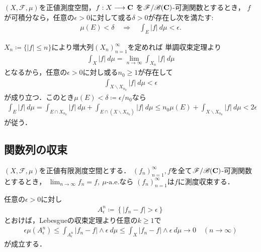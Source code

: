 	\begin{screen}
		\begin{thm}[可積分なら積分値を一様に小さくできる]\label{thm:integrable_intvalue_uniformly_shrinking}
			$(X,\mathscr{F},\mu)$を正値測度空間，$f:X \longrightarrow \mathbf{C}$
			を$\mathscr{F}/\mathscr{B}(\mathbf{C})$-可測関数とするとき，
			$f$が可積分なら，任意の$\epsilon > 0$に対して或る$\delta > 0$が存在し次を満たす:
			\begin{align}
				\mu(E) < \delta \quad \Longrightarrow \quad \int_E |f|\ d\mu < \epsilon.
			\end{align}
		\end{thm}
	\end{screen}
	
	\begin{prf}
		$X_n \coloneqq \{|f| \leq n\}$により増大列$(X_n)_{n=1}^\infty$を定めれば
		単調収束定理より
		\begin{align}
			\int_X |f|\ d\mu = \lim_{n \to \infty} \int_{X_n} |f|\ d\mu
		\end{align}
		となるから，任意の$\epsilon > 0$に対し或る$n_0 \geq 1$が存在して
		\begin{align}
			\int_{X \backslash X_{n_0}} |f|\ d\mu < \epsilon
		\end{align}
		が成り立つ．このとき$\mu(E) < \delta \coloneqq \epsilon/n_0$なら
		\begin{align}
			\int_E |f|\ d\mu
			= \int_{E \cap X_{n_0}} |f|\ d\mu + \int_{E \cap (X \backslash X_{n_0})} |f|\ d\mu
			\leq n_0 \mu(E) + \int_{X \backslash X_{n_0}} |f|\ d\mu
			< 2\epsilon
		\end{align}
		が従う．
		\QED
	\end{prf}
	
	\subsection{関数列の収束}
		\begin{screen}
			\begin{dfn}[概収束すれば測度収束する]
				$(X,\mathscr{F},\mu)$を正値有限測度空間とする．
				$(f_n)_{n=1}^\infty,f$を全て$\mathscr{F}/\mathscr{B}(\mathbf{C})$-可測関数とするとき，
				$\lim_{n \to \infty} f_n = f,\ \mbox{$\mu$-a.e.}$なら
				$(f_n)_{n=1}^\infty$は$f$に測度収束する．
			\end{dfn}
		\end{screen}
		
		\begin{prf}
			任意の$\epsilon > 0$に対し
			\begin{align}
				A^n_\epsilon \coloneqq \left\{ |f_n - f| > \epsilon \right\}
			\end{align}
			とおけば，Lebesgueの収束定理より任意の$k \geq 1$で
			\begin{align}
				\epsilon \mu\left(A^n_\epsilon\right)
				\leq \int_{A^n_\epsilon} |f_n - f| \wedge \epsilon\ d\mu
				\leq \int_{X} |f_n - f| \wedge \epsilon\ d\mu
				\longrightarrow 0
				\quad (n \longrightarrow \infty)
			\end{align}
			が成立する．
			\QED
		\end{prf}
		
